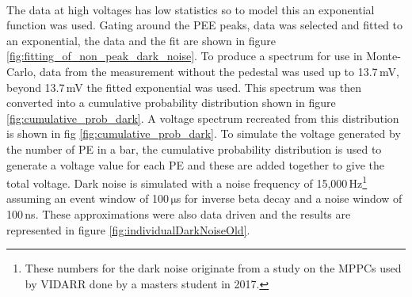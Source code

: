 \\The data at high voltages has low statistics so to model this an exponential function was used. Gating around the PEE peaks, data was selected and fitted to an exponential, the data and the fit are shown in figure \ref{fig:fitting_of_non_peak_dark_noise}. To produce a spectrum for use in Monte-Carlo, data from the measurement without the pedestal was used up to 13.7\,mV, beyond 13.7\,mV the fitted exponential was used. This spectrum was then converted into a cumulative probability distribution shown in figure \ref{fig:cumulative_prob_dark}. A voltage spectrum recreated from this distribution is shown in fig \ref{fig:cumulative_prob_dark}. To simulate the voltage generated by the number of PE in a bar, the cumulative probability distribution is used to generate a voltage value for each PE and these are added together to give the total voltage. Dark noise is simulated with a noise frequency of 15,000\,Hz\footnote{These numbers for the dark noise originate from a study on the MPPCs used by VIDARR done by a masters student in 2017.} assuming an event window of 100\,$\mathrm{\mu}$s for inverse beta decay and a noise window of 100\,ns. These approximations were also data driven and the results are represented in figure \ref{fig:individualDarkNoiseOld}.
